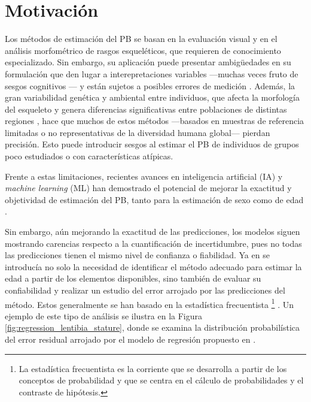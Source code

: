 
\section{Motivación}

Los métodos de estimación del \acrshort{PB} se basan en la evaluación visual y en el análisis morfométrico de rasgos esqueléticos, que requieren de conocimiento especializado. Sin embargo, su aplicación puede presentar ambigüedades en su formulación que den lugar a interepretaciones variables ---muchas veces fruto de sesgos cognitivos \cite{nakhaeizadeh2014, cooper2019}--- y están sujetos a posibles errores de medición \cite{langley2018}. Además, la gran variabilidad genética y ambiental entre individuos, que afecta la morfología del esqueleto y genera diferencias significativas entre poblaciones de distintas regiones \cite{ubelaker2017}, hace que muchos de estos métodos ---basados en muestras de referencia limitadas o no representativas de la diversidad humana global--- pierdan precisión. Esto puede introducir sesgos al estimar el \acrshort{PB} de individuos de grupos poco estudiados o con características atípicas.

Frente a estas limitaciones, recientes avances en inteligencia artificial (\acrshort{IA}) y \textit{machine learning} (\acrshort{ML}) han demostrado el potencial de mejorar la exactitud y objetividad de estimación del \acrshort{PB}, tanto para la estimación de sexo \cite{curate2017, darmawan2015, pinto2016} como de edad \cite{kim2017, larson2018, lee2017}.

Sin embargo, aún mejorando la exactitud de las predicciones, los modelos siguen mostrando carencias respecto a la cuantificación de incertidumbre, pues no todas las predicciones tienen el mismo nivel de confianza o fiabilidad. Ya en \cite{ferrante2009} se introducía no solo la necesidad de identificar el método adecuado para estimar la edad a partir de los elementos disponibles, sino también de evaluar su confiabilidad y realizar un estudio del error arrojado por las predicciones del método. Estos generalmente se han basado en la estadística frecuentista%
\footnote{
    La estadística frecuentista es la corriente que se desarrolla a partir de los conceptos de probabilidad y que se centra en el cálculo de probabilidades y el contraste de hipótesis.
}
\cite{verma2020, stepanovsky2024, heinrich2024}. Un ejemplo de este tipo de análisis se ilustra en la Figura \ref{fig:regression_lentibia_stature}, donde se examina la distribución probabilística del error residual arrojado por el modelo de regresión propuesto en \cite{verma2020}.

